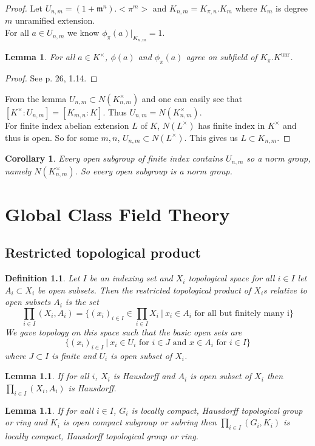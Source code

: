 \documentclass[twoside, 12pt]{iiser-thesis}
\newtheorem{lem}[thm]{ Lemma}
\newtheorem{cor}[thm]{ Corollary}
\newtheorem{defi}{ Definition}[section]
\newcommand{\x}{\times}
\newcommand{\un}{\text{unr}}
\begin{document}
\begin{proof}
Let $U_{n,m}=(1 + \mathfrak m ^n). <\pi ^m>$ and $K_{n,m}=K_{\pi,n}.K_m$ where $K_m $ is degree $m$ unramified extension. \\
For all $a\in U_{n,m}$ we know $ \phi _\pi (a) \big | _{K_{n,m}}=1$. 
\begin{lem}
For all $a\in K^\x$, $\phi (a) $ and $\phi _\pi (a)$ agree on subfield of $K_{\pi}.K^\un $.
\end{lem}
\begin{proof}
See \cite{milneCFT} p. 26, 1.14.
\end{proof}
From the lemma $U_{n,m} \subset N(K^\x _{n,m})$ and one can easily see that $[K^\x :U_{n,m}]=[K_{m,n}:K]$. Thus $U_{n,m}= N(K^\x _{n,m})$. \\
For finite index abelian extension $L$ of $K$, $N(L^\x)$ has finite index in $K^\x$ and thus is open. So for some $m,n$, $U _{n,m} \subset N(L^\x)$. This gives us $L \subset K_{n,m}$.
\end{proof}
\begin{cor}
Every open subgroup of finite index contains $U_{n,m}$ so a norm group, namely $N(K^\x _{n,m})$. So every open subgroup is a norm group.  
\end{cor}

\chapter{Global Class Field Theory}
\section{Restricted topological product}
\begin{defi}
Let $I$ be an indexing set and $X_i$ topological space for all $i \in I$ let $A_i \subset X_i$ be open subsets. Then the restricted topological product of $X_i$s relative to open subsets $A_i$ is the set \[ \prod _{i\in I} (X_i,A_i) = \Big \{(x_i)_{i\in I} \in \prod _{i\in I} X_i \ \Big | \ x_i \in A_i \text{ for all but finitely many i} \Big  \}\]
We gave topology on this space such that the basic open sets are \[ \{(x_i)_{i\in I} \ | \ x_i \in U_i \text{ for } i \in J \text{ and } x\in A_i \text{ for } i \in I \}\] 
where $J \subset I$ is finite and $U_i$ is open subset of $X_i$.
\end{defi}
\begin{lem} If for all $i$, $X_i$ is Hausdorff and $A_i$ is open subset of $X_i$ then $\prod _{i\in I} (X_i,A_i)$ is Hausdorff.
\end{lem}
\begin{lem}
If for aall $i\in I$, $G_i$ is locally compact, Hausdorff topological group or ring and $K_i$ is open compact subgroup or subring then $\prod _{i\in I} (G_i,K_i)$ is locally compact, Hausdorff topological group or ring.
\end{lem}	
\end{document}
